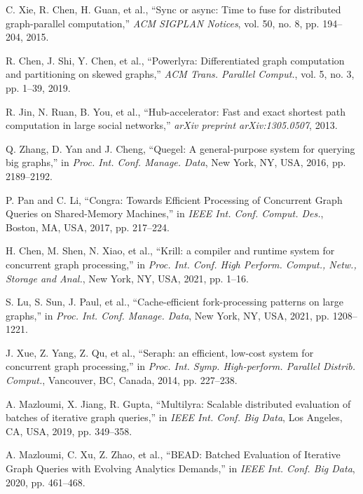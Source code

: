 \documentclass[lettersize,journal]{IEEEtran} %
\begin{document}
\begin{thebibliography}{100}
  C. Xie, R. Chen, H. Guan, et al., ``Sync or async: Time to fuse for distributed graph-parallel computation,'' \textit{ACM SIGPLAN Notices}, vol. 50, no. 8, pp. 194--204, 2015.
  
  R. Chen, J. Shi, Y. Chen, et al., ``Powerlyra: Differentiated graph computation and partitioning on skewed graphs,'' \textit{ACM Trans. Parallel Comput.}, vol. 5, no. 3, pp. 1--39, 2019.

  R. Jin, N. Ruan, B. You, et al., ``Hub-accelerator: Fast and exact shortest path computation in large social networks,'' \textit{arXiv preprint arXiv:1305.0507}, 2013.
  
  Q. Zhang, D. Yan and J. Cheng, ``Quegel: A general-purpose system for querying big graphs,'' in \textit{Proc. Int. Conf. Manage. Data}, New York, NY, USA, 2016, pp. 2189--2192.
  
  P. Pan and C. Li, ``Congra: Towards Efficient Processing of Concurrent Graph Queries on Shared-Memory Machines,'' in \textit{IEEE Int. Conf. Comput. Des.}, Boston, MA, USA, 2017, pp. 217--224.
  
  H. Chen, M. Shen, N. Xiao, et al., ``Krill: a compiler and runtime system for concurrent graph processing,'' in \textit{Proc. Int. Conf. High Perform. Comput., Netw., Storage and Anal.}, New York, NY, USA, 2021, pp. 1--16.
  
  S. Lu, S. Sun, J. Paul, et al., ``Cache-efficient fork-processing patterns on large graphs,'' in \textit{Proc. Int. Conf. Manage. Data}, New York, NY, USA, 2021, pp. 1208--1221.
  
  J. Xue, Z. Yang, Z. Qu, et al., ``Seraph: an efficient, low-cost system for concurrent graph processing,'' in \textit{Proc. Int. Symp. High-perform. Parallel Distrib. Comput.}, Vancouver, BC, Canada, 2014, pp. 227--238.
  
  A. Mazloumi, X. Jiang, R. Gupta, ``Multilyra: Scalable distributed evaluation of batches of iterative graph queries,'' in \textit{IEEE Int. Conf. Big Data}, Los Angeles, CA, USA, 2019, pp. 349--358.
  
  A. Mazloumi, C. Xu, Z. Zhao, et al., ``BEAD: Batched Evaluation of Iterative Graph Queries with Evolving Analytics Demands,'' in \textit{IEEE Int. Conf. Big Data}, 2020, pp. 461--468.
  
  
  
  
  \end{thebibliography}
\end{document}
